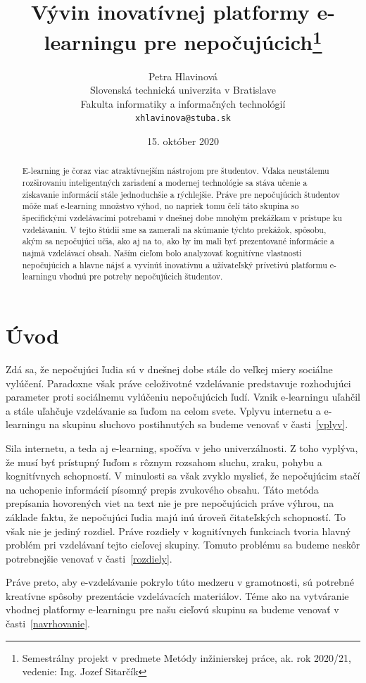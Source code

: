 \documentclass[10pt,oneside,slovak,a4paper]{article}
\title{Vývin inovatívnej platformy e-learningu pre nepočujúcich\thanks{Semestrálny projekt v predmete Metódy inžinierskej práce, ak. rok 2020/21, vedenie: Ing. Jozef Sitarčík}}
\author{Petra Hlavinová\\[2pt]
	{\small Slovenská technická univerzita v Bratislave}\\
	{\small Fakulta informatiky a informačných technológií}\\
	{\small \texttt{xhlavinova@stuba.sk}}
	}
\date{\small 15. október 2020}
\begin{document}
\maketitle

\begin{abstract}
E-learning je čoraz viac atraktívnejším nástrojom pre študentov. Vďaka neustálemu rozširovaniu inteligentných zariadení a modernej technológie sa stáva učenie a získavanie informácií stále jednoduchšie a rýchlejšie. Práve pre nepočujúcich študentov môže mať e-learning množstvo výhod, no napriek tomu čelí táto skupina so špecifickými vzdelávacími potrebami v dnešnej dobe mnohým prekážkam v prístupe ku vzdelávaniu. V tejto štúdii sme sa zamerali na skúmanie týchto prekážok, spôsobu, akým sa nepočujúci učia, ako aj na to, ako by im mali byť prezentované informácie a najmä vzdelávací obsah. Naším cieľom bolo analyzovať kognitívne vlastnosti nepočujúcich a hlavne nájsť a vyvinúť inovatívnu a užívateľský prívetivú platformu e-learningu vhodnú pre potreby nepočujúcich študentov. 
\end{abstract}

\section{Úvod}

Zdá sa, že nepočujúci ľudia sú v dnešnej dobe stále do veľkej miery sociálne vylúčení. Paradoxne však práve celoživotné vzdelávanie predstavuje rozhodujúci parameter proti sociálnemu vylúčeniu nepočujúcich ľudí. Vznik e-learningu uľahčil a stále uľahčuje vzdelávanie sa ľuďom na celom svete. Vplyvu internetu a e-learningu na skupinu sluchovo postihnutých sa budeme venovať v časti~\ref{vplyv}.

Sila internetu, a teda aj e-learning, spočíva v jeho univerzálnosti. Z toho vyplýva, že musí byť prístupný ľuďom s rôznym rozsahom sluchu, zraku, pohybu a kognitívnych schopností. V minulosti sa však zvyklo myslieť, že nepočujúcim stačí na uchopenie informácií písomný prepis zvukového obsahu. Táto metóda prepísania hovorených viet na text nie je pre nepočujúcich práve výhrou, na základe faktu, že nepočujúci ľudia majú inú úroveň čitateľských schopností. To však nie je jediný rozdiel. Práve rozdiely v kognitívnych funkciach tvoria hlavný problém pri vzdelávaní tejto cieľovej skupiny. Tomuto problému sa budeme neskôr potrebnejšie venovať v časti~\ref{rozdiely}.
 
Práve preto, aby e-vzdelávanie pokrylo túto medzeru v gramotnosti, sú potrebné kreatívne spôsoby prezentácie vzdelávacích materiálov. Téme ako na vytváranie vhodnej platformy e-learningu pre našu cieľovú skupinu sa budeme venovať v časti~\ref{navrhovanie}.
\end{document}
